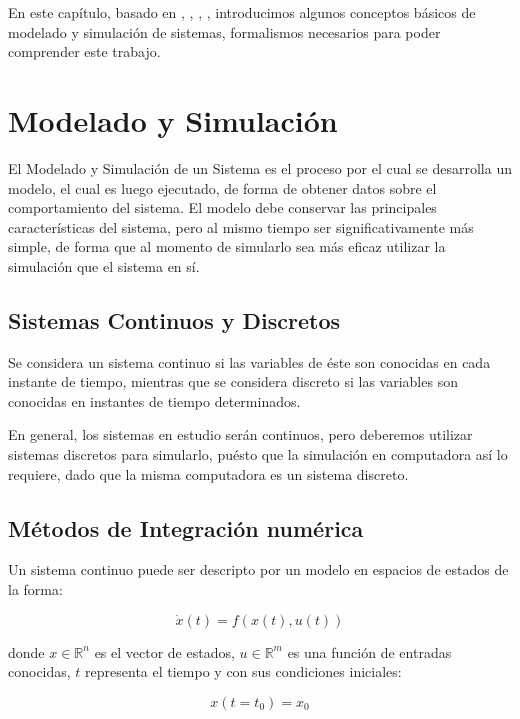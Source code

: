 	En este capítulo, basado en \cite{Fer12}, \cite{Ber12Th}, \cite{BK11}, \cite{BK13}, introducimos algunos conceptos básicos de modelado y 
	simulación de sistemas, formalismos necesarios para poder comprender este trabajo. 

\section{Modelado y Simulación}
	El Modelado y Simulación\cite{Zeigler} de un Sistema es el proceso por el cual se desarrolla un modelo, el cual es luego ejecutado, de forma de obtener datos 
	sobre el comportamiento del sistema.  El modelo debe conservar las principales características del sistema, pero al mismo tiempo ser significativamente 
	más simple, de forma que al momento de simularlo sea más eficaz utilizar la simulación que el sistema en sí.

	\subsection{Sistemas Continuos y Discretos}
	Se considera un sistema continuo si las variables de éste son conocidas en cada instante de tiempo, mientras que se considera discreto si las 
	variables son conocidas en instantes de tiempo determinados.

	En general, los sistemas en estudio serán continuos, pero deberemos utilizar sistemas discretos para simularlo, puésto que la simulación en 
	computadora así lo requiere, dado que la misma computadora es un sistema discreto.

	\subsection{Métodos de Integración numérica} \label{sec:num_integ}
	Un sistema continuo puede ser descripto por un modelo en espacios de estados de la forma:

	\begin{equation} \label{eq:eq1}
	\dot{x}(t) = f (x(t), u(t))
	\end{equation}

	donde $x \in \mathbb{R}^n$  es el vector de estados, $u \in \mathbb{R}^m$ es una función de entradas conocidas,
	$t$ representa el tiempo y con sus condiciones iniciales:

	\begin{equation} \label{eq:eq2}
	x(t = t_0 ) = x_0
	\end{equation}

